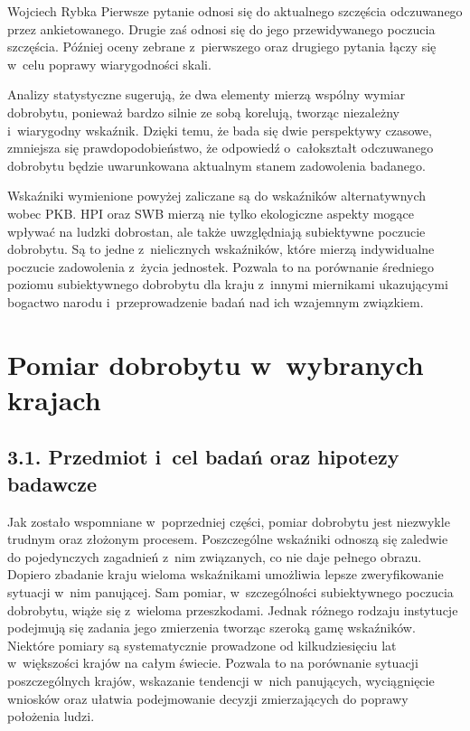 \begin{artplenv}{Wojciech Rybka}
Pierwsze pytanie odnosi się do aktualnego szczęścia odczuwanego przez ankietowanego. Drugie zaś odnosi się do jego
przewidywanego poczucia szczęścia. Później oceny zebrane z~pierwszego oraz drugiego pytania łączy się w~celu poprawy
wiarygodności skali. 

Analizy statystyczne sugerują, że dwa elementy mierzą wspólny wymiar dobrobytu, ponieważ bardzo silnie ze sobą korelują,
tworząc niezależny i~wiarygodny wskaźnik. Dzięki temu, że bada się dwie perspektywy czasowe, zmniejsza się
prawdopodobieństwo, że odpowiedź o~całokształt odczuwanego dobrobytu będzie uwarunkowana aktualnym stanem zadowolenia
badanego.



Wskaźniki wymienione powyżej zaliczane są do wskaźników alternatywnych wobec PKB. HPI oraz SWB mierzą nie tylko
ekologiczne aspekty mogące wpływać na ludzki dobrostan, ale także uwzględniają subiektywne poczucie dobrobytu. Są to
jedne z~nielicznych wskaźników, które mierzą indywidualne poczucie zadowolenia z~życia jednostek. Pozwala to na
porównanie średniego poziomu subiektywnego dobrobytu dla kraju z~innymi miernikami ukazującymi bogactwo
narodu i~przeprowadzenie badań nad ich wzajemnym związkiem. 

\section{Pomiar dobrobytu w~wybranych krajach}
\baselineskip
\subsection{3.1. Przedmiot i~cel badań oraz hipotezy badawcze}
Jak zostało wspomniane w~poprzedniej części, pomiar dobrobytu jest niezwykle trudnym oraz złożonym procesem. Poszczególne
wskaźniki odnoszą się zaledwie do pojedynczych zagadnień z~nim związanych, co nie daje pełnego obrazu. Dopiero
zbadanie kraju wieloma wskaźnikami umożliwia lepsze zweryfikowanie sytuacji w~nim panującej.
Sam pomiar, w~szczególności subiektywnego poczucia dobrobytu, wiąże się z~wieloma przeszkodami.
Jednak różnego rodzaju instytucje
podejmują się zadania jego zmierzenia tworząc szeroką gamę wskaźników. Niektóre pomiary są systematycznie prowadzone od
kilkudziesięciu lat w~większości krajów na całym świecie. Pozwala to na porównanie sytuacji poszczególnych krajów,
wskazanie tendencji w~nich panujących, wyciągnięcie wniosków oraz ułatwia podejmowanie decyzji zmierzających do poprawy
położenia ludzi. 


\end{artplenv}
